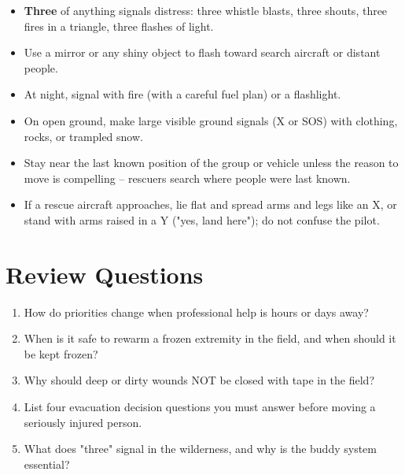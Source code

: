 \begin{itemize}[leftmargin=*]
  \item \textbf{Three} of anything signals distress: three whistle blasts, three shouts, three fires in a triangle, three flashes of light.
  \item Use a mirror or any shiny object to flash toward search aircraft or distant people.
  \item At night, signal with fire (with a careful fuel plan) or a flashlight.
  \item On open ground, make large visible ground signals (X or SOS) with clothing, rocks, or trampled snow.
  \item Stay near the last known position of the group or vehicle unless the reason to move is compelling -- rescuers search where people were last known.
  \item If a rescue aircraft approaches, lie flat and spread arms and legs like an X, or stand with arms raised in a Y ("yes, land here"); do not confuse the pilot.
\end{itemize}


\section{Review Questions}

\begin{enumerate}[leftmargin=*]
\item How do priorities change when professional help is hours or days away?
\item When is it safe to rewarm a frozen extremity in the field, and when should it be kept frozen?
\item Why should deep or dirty wounds NOT be closed with tape in the field?
\item List four evacuation decision questions you must answer before moving a seriously injured person.
\item What does "three" signal in the wilderness, and why is the buddy system essential?
\end{enumerate}
